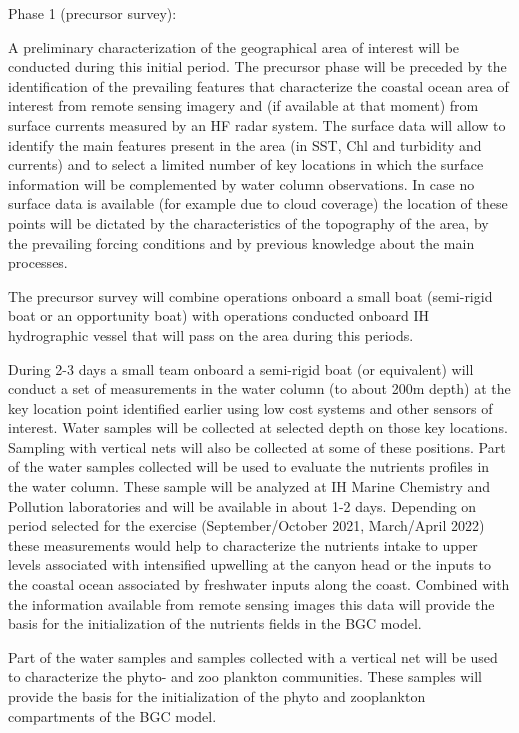 Phase 1 (precursor survey):
 
A preliminary characterization of the geographical area of interest will
be conducted during this initial period. The precursor phase will be
preceded by the identification of the prevailing features that
characterize the coastal ocean area of interest from remote sensing
imagery and (if available at that moment) from surface currents measured
by an HF radar system. The surface data will allow to identify the main
features present in the area (in SST, Chl and turbidity and currents)
and to select a limited number of key locations in which the surface
information will be complemented by water column observations. In case
no surface data is available (for example due to cloud coverage) the
location of these points will be dictated by the characteristics of the
topography of the area, by the prevailing forcing conditions and by
previous knowledge about the main processes.
 
The precursor survey will combine operations onboard a small boat (semi-rigid boat or an opportunity boat) with operations conducted onboard IH hydrographic vessel that will pass on the area during this periods.
 
During 2-3 days a small team onboard a semi-rigid boat (or equivalent) will conduct a set of measurements in the water column (to about 200m depth) at the key location point identified earlier using low cost systems and other sensors of interest. Water samples will be collected at selected depth on those key locations. Sampling with vertical nets will also be collected at some of these positions. Part of the water samples collected will be used to evaluate the nutrients profiles in the water column. These sample will be analyzed at IH Marine Chemistry and Pollution laboratories and will be available in about 1-2 days. Depending on period selected for the exercise (September/October 2021, March/April 2022) these measurements would help to characterize the nutrients intake to upper levels associated with intensified upwelling at the canyon head or the inputs to the coastal ocean associated by freshwater inputs along the coast. Combined with the information available from remote sensing images this data will provide the basis for the initialization of the nutrients fields in the BGC model.
 
Part of the water samples and samples collected with a vertical net will be used to characterize the phyto- and zoo plankton communities. These samples will provide the basis for the initialization of the phyto and zooplankton compartments of the BGC model.
 
